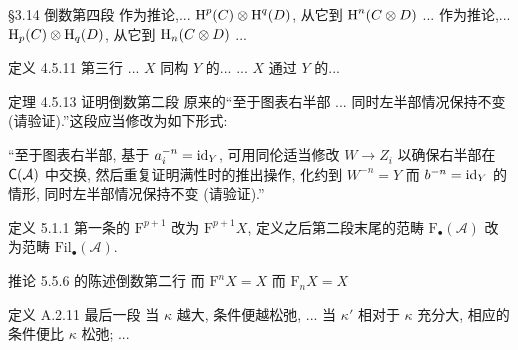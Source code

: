 \documentclass{AJerrata}
\begin{document}
\begin{Errata}
		\item[\S 3.14 倒数第四段]
		\Orig 作为推论,... $\operatorname{H}^p(C) \otimes \operatorname{H}^q(D)$, 从它到 $\operatorname{H}^n(C \otimes D)$ ...
		\Corr 作为推论,... $\operatorname{H}_p(C) \otimes \operatorname{H}_q(D)$, 从它到 $\operatorname{H}_n(C \otimes D)$ ...
		
		\item[定义 4.5.11 第三行]
		\Orig ... $X$ 同构 $Y$ 的...
		\Corr ... $X$ 通过 $Y$ 的...
		
		\item[定理 4.5.13 证明倒数第二段]
		原来的``至于图表右半部 ... 同时左半部情况保持不变 (请验证).''这段应当修改为如下形式:
		
		``至于图表右半部, 基于 $a_i^{-n} = \mathrm{id}_Y$, 可用同伦适当修改 $W \to Z_i$ 以确保右半部在 $\mathsf{C}(\mathcal{A})$ 中交换, 然后重复证明满性时的推出操作, 化约到 $W^{-n} = Y$ 而 $b^{-n} = \mathrm{id}_Y$ 的情形, 同时左半部情况保持不变 (请验证).''
		
		\item[定义 5.1.1]
		第一条的 $\mathrm{F}^{p+1}$ 改为 $\mathrm{F}^{p+1} X$, 定义之后第二段末尾的范畴 $\mathrm{F}_{\bullet}(\mathcal{A})$ 改为范畴 $\mathrm{Fil}_{\bullet}(\mathcal{A})$.
		
		\item[推论 5.5.6 的陈述倒数第二行]
		\Orig 而 $\mathrm{F}^n X = X$
		\Corr 而 $\mathrm{F}_n X = X$
		
		\item[定义 A.2.11 最后一段]
		\Orig 当 $\kappa$ 越大, 条件便越松弛, ...
		\Corr 当 $\kappa'$ 相对于 $\kappa$ 充分大, 相应的条件便比 $\kappa$ 松弛; ...
	\end{Errata}
\end{document}

